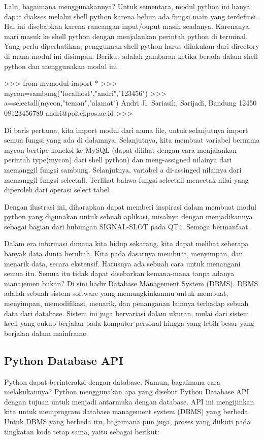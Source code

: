Lalu, bagaimana menggunakannya? Untuk sementara, modul python ini hanya dapat diakses melalui shell python karena belum ada fungsi main yang terdefinsi. Hal ini disebabkan karena rancangan input/ouput masih seadanya. Karenanya, mari masuk ke shell python dengan menjalankan perintah python di terminal. Yang perlu diperhatikan, penggunaan shell python harus dilakukan dari directory di mana modul ini disimpan. Berikut adalah gambaran ketika berada dalam shell python dan menggunakan modul ini. 

\noindent 
>>> from mymodul import * 
\noindent 
>>> mycon=sambung("localhost","andri","123456") 
\noindent 
>>> a=selectall(mycon,"teman","alamat") 
\noindent 
Andri Jl. Sariasih, Sarijadi, Bandung 12450 08123456789 andri@poltekpos.ac.id 
\noindent 
>>>

Di baris pertama, kita import modul dari nama file, untuk selanjutnya import semua fungsi yang ada di dalamnya. Selanjutnya, kita membuat variabel bernama mycon bertipe koneksi ke MySQL (dapat dilihat dengan cara menjalankan perintah type(mycon) dari shell python) dan meng-assigned nilainya dari memanggil fungsi sambung. Selanjutnya, variabel a di-assinged nilainya dari memanggil fungsi selectall. Terlihat bahwa fungsi selectall mencetak nilai yang diperoleh dari operasi select tabel. 
\vspace{12pt}

Dengan ilustrasi ini, diharapkan dapat memberi inspirasi dalam membuat modul python yang digunakan untuk sebuah aplikasi, misalnya dengan menjadikannya sebagai bagian dari hubungan SIGNAL-SLOT pada QT4. Semoga bermanfaat. 
\vspace{12pt}

Dalam era informasi dimana kita hidup sekarang, kita dapat melihat seberapa banyak data dunia berubah. Kita pada dasarnya membuat, menyimpan, dan menarik data, secara ekstensif. Harusnya ada sebuah cara untuk menangani semua itu. Semua itu tidak dapat disebarkan kemana-mana tanpa adanya manajemen bukan? Di sini hadir Database Management System (DBMS). DBMS adalah sebuah sistem software yang memungkinkanmu untuk membuat, menyimpan, memodifikasi, menarik, dan penanganan lainnya terhadap sebuah data dari database. Sistem ini juga bervariasi dalam ukuran, mulai dari sistem kecil yang cukup berjalan pada komputer personal hingga yang lebih besar yang berjalan dalam mainframe. 
\vspace{12pt}
\noindent 

\subsection{Python Database API} 
Python dapat berinteraksi dengan database. Namun, bagaimana cara melakukannya? Python menggunakan apa yang disebut Python Database API dengan tujuan untuk menjadi antarmuka dengan database. API ini mengijinkan kita untuk memprogram database management system (DBMS) yang berbeda. Untuk DBMS yang berbeda itu, bagaimana pun juga, proses yang diikuti pada tingkatan kode tetap sama, yaitu sebagai berikut: 
\vspace{12pt}
\noindent 

